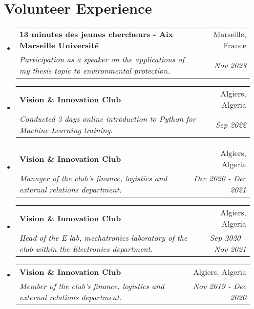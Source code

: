 \documentclass[a4paper,20pt]{article}
\makeatletter
\newcommand{\resumeSubheading}[4]{
  \vspace{-1pt}\item
    \begin{tabular*}{0.97\textwidth}{l@{\extracolsep{\fill}}r}
      \textbf{#1} & #2 \\
      \textit{#3} & \textit{#4} \\
    \end{tabular*}\vspace{-5pt}
}
\newcommand{\resumeSubHeadingListStart}{\begin{itemize}[leftmargin=*]}
\newcommand{\resumeSubHeadingListEnd}{\end{itemize}}
\makeatother
\begin{document}
\vspace{-5pt}
\section{Volunteer Experience}
  \resumeSubHeadingListStart
    \resumeSubheading
    {13 minutes des jeunes chercheurs - Aix Marseille Université}{Marseille, France}
    {Participation as a speaker on the applications of my thesis topic to environmental protection.}{Nov 2023}
    \vspace{5pt}
	  \resumeSubheading
    {Vision \& Innovation Club}{Algiers, Algeria}
    {Conducted 3 days online introduction to Python for Machine Learning training.}{Sep 2022}
    \vspace{5pt}
    \resumeSubheading
    {Vision \& Innovation Club}{Algiers, Algeria}
    {Manager of the club's finance, logistics and external relations department.}{Dec 2020 - Dec 2021}
    \vspace{5pt}
    \resumeSubheading
    {Vision \& Innovation Club}{Algiers, Algeria}
    {Head of the E-lab, mechatronics laboratory of the club within the Electronics department.}{Sep 2020 - Nov 2021}
    \vspace{5pt}
    \resumeSubheading
        {Vision \& Innovation Club}{Algiers, Algeria}
        {Member of the club's finance, logistics and external relations department.}{Nov 2019 - Dec 2020}

  \resumeSubHeadingListEnd

\vspace{-5pt}
\end{document}
